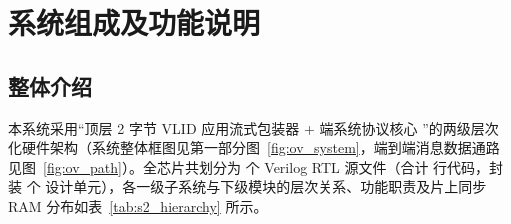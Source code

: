 
\section{系统组成及功能说明}

\subsection{整体介绍}

本系统采用“顶层 2 字节 VLID 应用流式包装器  + 端系统协议核心 ”的两级层次化硬件架构（系统整体框图见第一部分图~\ref{fig:ov_system}，端到端消息数据通路见图~\ref{fig:ov_path}）。全芯片共划分为 \RtlFileCount{} 个 Verilog RTL 源文件（合计 \countsep{\RtlLineCount} 行代码，封装 \DesignUnitCount{} 个  设计单元），各一级子系统与下级模块的层次关系、功能职责及片上同步 RAM 分布如表~\ref{tab:s2_hierarchy} 所示。

